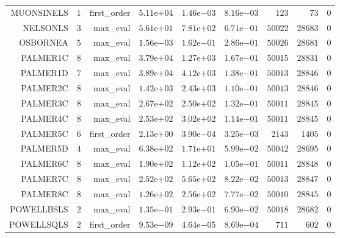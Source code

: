 \begin{longtable}{rrrrrrrrr}
MUONSINELS & \(     1\) & first\_order & \( 5.11\)e\(+04\) & \( 1.46\)e\(-03\) & \( 8.16\)e\(-03\) & \(   123\) & \(    73\) & \(     0\) \\
NELSONLS & \(     3\) & max\_eval & \( 5.61\)e\(+01\) & \( 7.81\)e\(+02\) & \( 6.71\)e\(-01\) & \( 50022\) & \( 28683\) & \(     0\) \\
OSBORNEA & \(     5\) & max\_eval & \( 1.56\)e\(-03\) & \( 1.62\)e\(-01\) & \( 2.86\)e\(-01\) & \( 50026\) & \( 28681\) & \(     0\) \\
PALMER1C & \(     8\) & max\_eval & \( 3.79\)e\(+04\) & \( 1.27\)e\(+03\) & \( 1.67\)e\(-01\) & \( 50015\) & \( 28831\) & \(     0\) \\
PALMER1D & \(     7\) & max\_eval & \( 3.89\)e\(+04\) & \( 4.12\)e\(+03\) & \( 1.38\)e\(-01\) & \( 50013\) & \( 28846\) & \(     0\) \\
PALMER2C & \(     8\) & max\_eval & \( 1.42\)e\(+03\) & \( 2.43\)e\(+03\) & \( 1.10\)e\(-01\) & \( 50013\) & \( 28846\) & \(     0\) \\
PALMER3C & \(     8\) & max\_eval & \( 2.67\)e\(+02\) & \( 2.50\)e\(+02\) & \( 1.32\)e\(-01\) & \( 50011\) & \( 28845\) & \(     0\) \\
PALMER4C & \(     8\) & max\_eval & \( 2.53\)e\(+02\) & \( 3.02\)e\(+02\) & \( 1.14\)e\(-01\) & \( 50011\) & \( 28845\) & \(     0\) \\
PALMER5C & \(     6\) & first\_order & \( 2.13\)e\(+00\) & \( 3.90\)e\(-04\) & \( 3.25\)e\(-03\) & \(  2143\) & \(  1405\) & \(     0\) \\
PALMER5D & \(     4\) & max\_eval & \( 6.38\)e\(+02\) & \( 1.71\)e\(+01\) & \( 5.99\)e\(-02\) & \( 50042\) & \( 28695\) & \(     0\) \\
PALMER6C & \(     8\) & max\_eval & \( 1.90\)e\(+02\) & \( 1.12\)e\(+02\) & \( 1.05\)e\(-01\) & \( 50011\) & \( 28848\) & \(     0\) \\
PALMER7C & \(     8\) & max\_eval & \( 2.52\)e\(+02\) & \( 5.65\)e\(+02\) & \( 8.22\)e\(-02\) & \( 50013\) & \( 28847\) & \(     0\) \\
PALMER8C & \(     8\) & max\_eval & \( 1.26\)e\(+02\) & \( 2.56\)e\(+02\) & \( 7.77\)e\(-02\) & \( 50010\) & \( 28845\) & \(     0\) \\
POWELLBSLS & \(     2\) & max\_eval & \( 1.35\)e\(-01\) & \( 2.93\)e\(-01\) & \( 6.90\)e\(-02\) & \( 50018\) & \( 28682\) & \(     0\) \\
POWELLSQLS & \(     2\) & first\_order & \( 9.53\)e\(-09\) & \( 4.64\)e\(-05\) & \( 8.69\)e\(-04\) & \(   711\) & \(   602\) & \(     0\) \\

\end{longtable}
